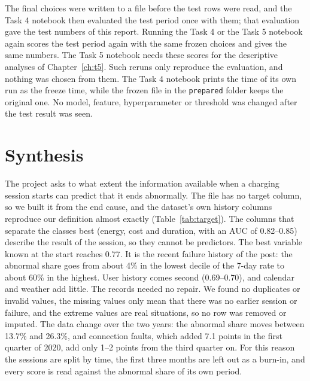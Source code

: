 \documentclass[12pt,a4paper,openany]{report}
\begin{document}
The final choices were written to a file before the test rows were read, and the Task 4 notebook then evaluated the
test period once with them; that evaluation gave the test numbers of this report. Running the Task 4 or the Task 5
notebook again scores the test period again with the same frozen choices and gives the same numbers. The Task 5
notebook needs these scores for the descriptive analyses of Chapter~\ref{ch:t5}. Such reruns only reproduce the
evaluation, and nothing was chosen from them. The Task 4 notebook prints the time of its own run as the freeze time,
while the frozen file in the \nolinkurl{prepared} folder keeps the original one. No model, feature, hyperparameter
or threshold was changed after the test result was seen.

\chapter{Synthesis}\label{ch:synthesis}

The project asks to what extent the information available when a charging session starts can predict that it
ends abnormally. The file has no target column, so we built it from the end cause, and the dataset's own history
columns reproduce our definition almost exactly (Table~\ref{tab:target}). The columns that separate the classes best (energy,
cost and duration, with an \acs{AUC} of 0.82--0.85) describe the result of the session, so they cannot be
predictors. The best variable known at the start reaches 0.77. It is the recent failure history of the post: the
abnormal share goes from about 4\% in the lowest decile of the 7-day rate to about 60\% in the highest. User
history comes second (0.69--0.70), and calendar and weather add little. The records needed no repair. We found no
duplicates or invalid values, the missing values only mean that there was no earlier session or failure, and the
extreme values are real situations, so no row was removed or imputed. The data change over the two years: the
abnormal share moves between 13.7\% and 26.3\%, and connection faults, which added 7.1 points in the first quarter
of 2020, add only 1--2 points from the third quarter on. For this reason the sessions are split by time, the first
three months are left out as a burn-in, and every score is read against the abnormal share of its own period.
\end{document}
